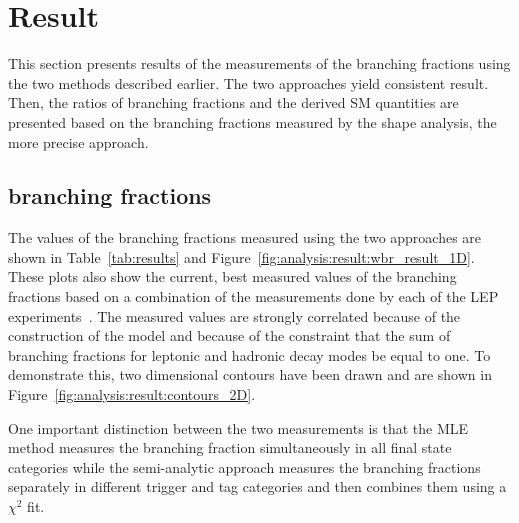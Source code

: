 \section{Result}
\label{sec:analysis:result}


This section presents results of the measurements of the branching
fractions using the two methods described earlier. 
The two approaches yield consistent result.
Then, the ratios of branching
fractions and the derived SM quantities are presented based on the branching
fractions measured by the shape analysis, the more precise approach.


\subsection{\PW branching fractions}
\label{sec:analysis:result:BWl}
The values of the
branching fractions measured using the two approaches are shown in
Table~\ref{tab:results} and Figure~\ref{fig:analysis:result:wbr_result_1D}.  These plots
also show the current, best measured values of the \PW branching fractions
based on a combination of the measurements done by each of the LEP
experiments~\cite{Schael:2013ita}.  The measured values are strongly
correlated because of the construction of the model and because of the
constraint that the sum of branching fractions for leptonic and hadronic
decay modes be equal to one.  To demonstrate this, two dimensional
contours have been drawn and are shown in Figure~\ref{fig:analysis:result:contours_2D}.

One important distinction between the two measurements is that the MLE
method measures the branching fraction simultaneously in all final state
categories while the semi-analytic approach measures the branching fractions
separately in different trigger and \PQb tag categories and then combines
them using a $\chi^{2}$ fit.  

